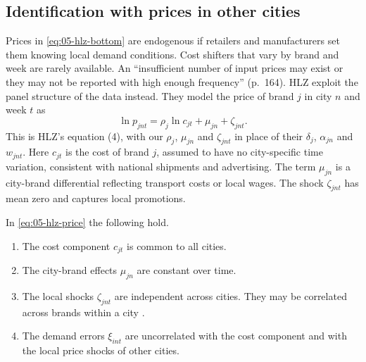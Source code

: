 \subsection{Identification with prices in other cities}\label{sec:05-hlz-identification}

Prices in \eqref{eq:05-hlz-bottom} are endogenous if retailers and manufacturers set them knowing local demand
conditions. Cost shifters that vary by brand and week are rarely available. An ``insufficient number of input
prices may exist or they may not be reported with high enough frequency'' (p.~164). HLZ exploit the panel
structure of the data instead. They model the price of brand $j$ in city $n$ and week $t$ as
\begin{equation}\label{eq:05-hlz-price}
  \ln p_{jnt} = \rho_j\ln c_{jt} + \mu_{jn} + \zeta_{jnt}.
\end{equation}
This is HLZ's equation (4), with our $\rho_j$, $\mu_{jn}$ and $\zeta_{jnt}$ in place of their $\delta_j$,
$\alpha_{jn}$ and $w_{jnt}$. Here $c_{jt}$ is the cost of brand $j$, assumed to have no
city-specific time variation, consistent with national shipments and advertising. The term $\mu_{jn}$ is a
city-brand differential reflecting transport costs or local wages. The shock $\zeta_{jnt}$ has mean zero and
captures local promotions.

\begin{assumption}\label{ass:05-hausman-iv}
In \eqref{eq:05-hlz-price} the following hold.
\begin{enumerate}[label=(\roman*)]
  \item The cost component $c_{jt}$ is common to all cities.
  \item The city-brand effects $\mu_{jn}$ are constant over time.
  \item The local shocks $\zeta_{jnt}$ are independent across cities. They may be correlated across brands
  within a city \citep[fn.~19]{Hausman1997}.
  \item The demand errors $\xi_{int}$ are uncorrelated with the cost component and with the local price shocks
  of other cities.
\end{enumerate}
\end{assumption}


